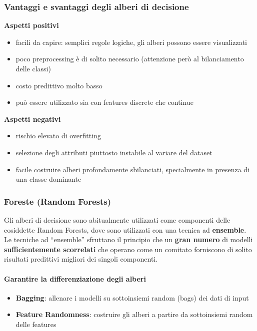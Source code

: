 \documentclass[a4paper,12pt]{article}
\newlength{\figgap}
\newcommand{\figura}[1]{%
  \par\addvspace{\figgap}%
  {\centering\noindent#1\par}%
  \addvspace{\figgap}%
  \noindent\ignorespaces
}
\begin{document}
\subsubsection*{Vantaggi e svantaggi degli alberi di decisione}
\figura{%
  \begin{minipage}[t]{0.48\linewidth}
    \textbf{Aspetti positivi}
    \begin{itemize}
        \item facili da capire: semplici regole logiche, gli alberi possono essere visualizzati
        \item poco preprocessing è di solito necessario (attenzione però al bilanciamento delle classi)
        \item costo predittivo molto basso
        \item può essere utilizzato sia con features discrete che continue
    \end{itemize}
  \end{minipage}%
  \hfill
  \begin{minipage}[t]{0.48\linewidth}
    \textbf{Aspetti negativi}
    \begin{itemize}
        \item rischio elevato di overfitting
        \item selezione degli attributi piuttosto instabile al variare del dataset
        \item facile costruire alberi profondamente sbilanciati, specialmente in presenza di una classe dominante
    \end{itemize}
  \end{minipage}%
}
\subsubsection{Foreste (Random Forests)}
Gli alberi di decisione sono abitualmente utilizzati come componenti delle cosiddette Random Forests, dove sono utilizzati con una tecnica ad \textbf{ensemble}.\\
Le tecniche ad ``ensemble'' sfruttano il principio che un \textbf{gran numero} di modelli \textbf{sufficientemente scorrelati} che operano come un comitato forniscono di solito risultati predittivi migliori dei singoli componenti.
\paragraph{Garantire la differenziazione degli alberi}
\begin{itemize}
    \item \textbf{Bagging}: allenare i modelli su sottoinsiemi random (bags) dei dati di input
    \item \textbf{Feature Randomness}: costruire gli alberi a partire da sottoinsiemi random delle features
\end{itemize}
\end{document}
